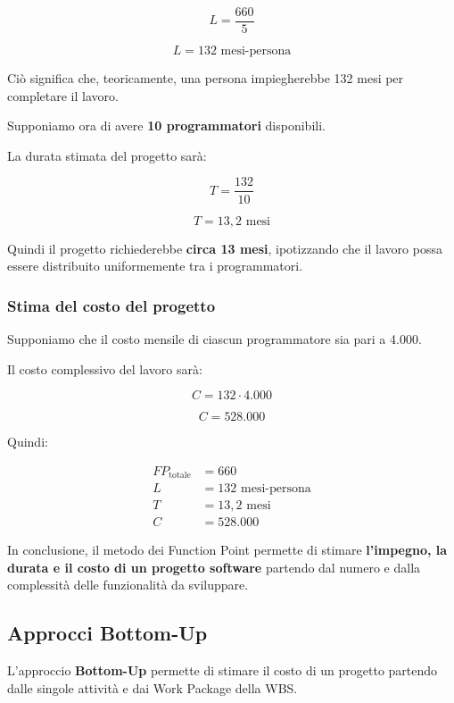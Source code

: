 \[
L=\frac{660}{5}
\]

\[
\boxed{L=132\text{ mesi-persona}}
\]

\noindent Ciò significa che, teoricamente,
una persona impiegherebbe 132 mesi
per completare il lavoro.

\medskip

\noindent Supponiamo ora di avere
\textbf{10 programmatori} disponibili.

\medskip

\noindent La durata stimata del progetto sarà:

\[
T=\frac{132}{10}
\]

\[
\boxed{T=13{,}2\text{ mesi}}
\]

\noindent Quindi il progetto richiederebbe
\textbf{circa 13 mesi}, ipotizzando che il lavoro
possa essere distribuito uniformemente tra i programmatori.


\subsubsection*{Stima del costo del progetto}

\noindent Supponiamo che il costo mensile
di ciascun programmatore sia pari a 4.000.

\medskip

\noindent Il costo complessivo del lavoro sarà:

\[
C=132\cdot4.000
\]

\[
\boxed{C=528.000}
\]

\noindent Quindi:

\[
\boxed{
\begin{aligned}
FP_{\text{totale}} &= 660\\
L &= 132\text{ mesi-persona}\\
T &= 13{,}2\text{ mesi}\\
C &= 528.000
\end{aligned}
}
\]

\noindent In conclusione, il metodo dei Function Point
permette di stimare \textbf{l'impegno, la durata
e il costo di un progetto software}
partendo dal numero e dalla complessità
delle funzionalità da sviluppare.




\subsection{Approcci Bottom-Up}

\noindent L'approccio \textbf{Bottom-Up} permette di stimare
il costo di un progetto partendo dalle singole attività
e dai Work Package della WBS.


